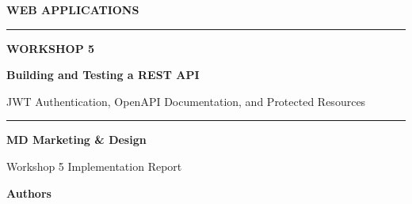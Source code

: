 \documentclass[11pt,a4paper]{article}
\begin{document}

\begin{titlepage}
\thispagestyle{empty}
\centering

\vspace*{1.2cm}

{\Large
\color{textgray}
\textbf{WEB APPLICATIONS}
\par}

\vspace{0.35cm}

{\color{accent}
\rule{0.82\textwidth}{1.2pt}
\par}

\vspace{1.15cm}

{\fontsize{20}{24}\selectfont
\color{accent}
\textbf{WORKSHOP 5}
\par}

\vspace{0.45cm}

{\fontsize{26}{32}\selectfont
\textbf{Building and Testing a REST API}
\par}

\vspace{0.35cm}

{\Large
\color{textgray}
JWT Authentication, OpenAPI Documentation,
and Protected Resources
\par}

\vspace{1.35cm}

{\color{accent}
\rule{0.40\textwidth}{0.7pt}
\par}

\vspace{0.55cm}

{\fontsize{28}{34}\selectfont
\textbf{MD Marketing \& Design}
\par}

\vspace{0.35cm}

{\large
\color{textgray}
Workshop 5 Implementation Report
\par}

\vspace{1.55cm}

{\large
\textbf{Authors}
\par}

\vspace{0.35cm}


\end{titlepage}
\end{document}
